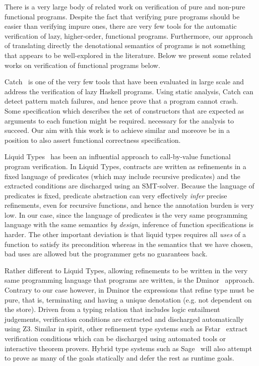 
There is a very large body of related work on verification of pure and non-pure
functional programs. Despite the fact that verifying pure programs should be easier than
verifying impure ones, there are very few tools for the automatic verification of lazy, 
higher-order, functional programs. Furthermore, our approach of translating directly the 
denotational semantics of programs is not something that appears to be well-explored in 
the literature. Below we present some related works on verification of functional 
programs below.

Catch~\cite{Mitchell:2008:PBE:1411286.1411293} is one of the very few tools that 
have been evaluated in large scale and address the verification of lazy Haskell 
programs. Using static analysis, Catch can detect pattern match failures, and hence 
prove that a program cannot crash. Some specification which describes the set of 
constructors that are expected as arguments to each function might be required. 
necessary for the analysis to succeed. Our aim with this work is to achieve similar and
moreove be in a position to also assert functional correctness specification.

Liquid Types~\cite{Rondon:2008:LT:1375581.1375602} has been an influential 
approach to call-by-value functional program verification. In Liquid Types, 
contracts are written as refinements in a fixed language of predicates (which may 
include recursive predicates) and the extracted conditions are discharged using an 
SMT-solver. Because the language of predicates is fixed, predicate abstraction can 
very effectively {\em infer} precise refinements, even for recursive functions, and 
hence the annotation burden is very low. In our case, since the language of predicates
is the very same programming language with the same semantics {\em by design}, inference
of function specifications is harder. The other important deviation is that liquid types
requires all {\em uses} of a function to satisfy its precondition whereas in the semantics
that we have chosen, bad uses are allowed but the programmer gets no guarantees back.

Rather different to Liquid Types, allowing refinements to be written 
in the very same programming language that programs are written, is the 
Dminor~\cite{Bierman+:subtyping} approach. Contrary to our case however, in Dminor
the expressions that refine type must be pure, that is, terminating and having a unique
denotation (e.g. not dependent on the store). Driven from a typing relation that includes
logic entailment judgements, verification conditions are extracted and discharged automatically using Z3. Similar in spirit, other refinement type systems such 
as Fstar~\cite{fstar} extract verification conditions which can be discharged 
using automated tools 
or interactive theorem provers. Hybrid type systems such as Sage~\cite{Knowles+:sage}
will also attempt to prove as many of the goals statically and defer the rest as runtime
goals.

